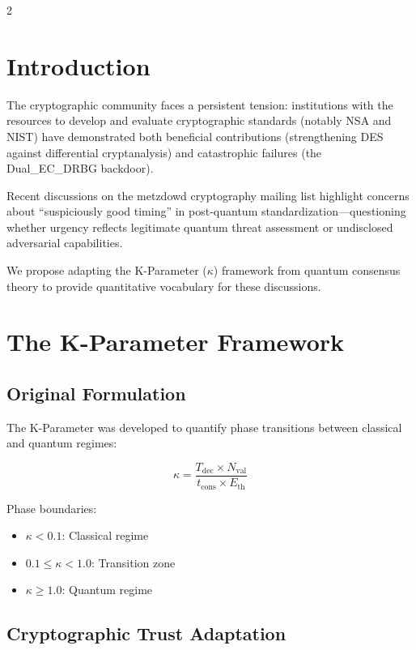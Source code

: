 \documentclass[11pt]{article}
\begin{document}
\begin{multicols}{2}

\section{Introduction}

The cryptographic community faces a persistent tension: institutions with the resources to develop and evaluate cryptographic standards (notably NSA and NIST) have demonstrated both beneficial contributions (strengthening DES against differential cryptanalysis) and catastrophic failures (the Dual\_EC\_DRBG backdoor).

Recent discussions on the metzdowd cryptography mailing list highlight concerns about ``suspiciously good timing'' in post-quantum standardization---questioning whether urgency reflects legitimate quantum threat assessment or undisclosed adversarial capabilities.

We propose adapting the K-Parameter ($\kappa$) framework from quantum consensus theory to provide quantitative vocabulary for these discussions.

\section{The K-Parameter Framework}

\subsection{Original Formulation}

The K-Parameter was developed to quantify phase transitions between classical and quantum regimes:

\begin{equation}
\kappa = \frac{T_{\text{dec}} \times N_{\text{val}}}{t_{\text{cons}} \times E_{\text{th}}}
\end{equation}

Phase boundaries:
\begin{itemize}[noitemsep]
    \item $\kappa < 0.1$: Classical regime
    \item $0.1 \leq \kappa < 1.0$: Transition zone
    \item $\kappa \geq 1.0$: Quantum regime
\end{itemize}

\subsection{Cryptographic Trust Adaptation}


\end{multicols}
\end{document}
